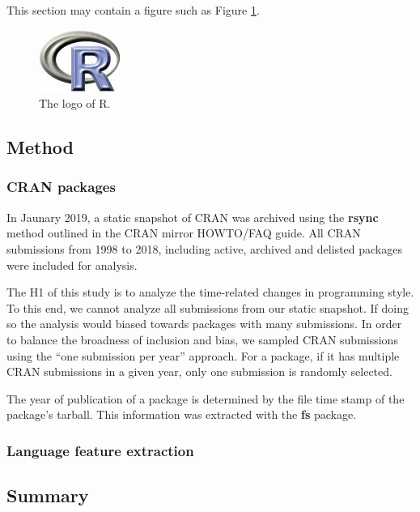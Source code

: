 This section may contain a figure such as Figure \ref{figure:rlogo}.

\begin{figure}[htbp]
  \centering
  \includegraphics{Rlogo}
  \caption{The logo of R.}
  \label{figure:rlogo}
\end{figure}

\hypertarget{method}{%
\subsection{Method}\label{method}}

\hypertarget{cran-packages}{%
\subsubsection{CRAN packages}\label{cran-packages}}

In Jaunary 2019, a static snapshot of CRAN was archived using the
\textbf{rsync} method outlined in the CRAN mirror HOWTO/FAQ guide. All
CRAN submissions from 1998 to 2018, including active, archived and
delisted packages were included for analysis.

The H1 of this study is to analyze the time-related changes in
programming style. To this end, we cannot analyze all submissions from
our static snapshot. If doing so the analysis would biased towards
packages with many submissions. In order to balance the broadness of
inclusion and bias, we sampled CRAN submissions using the ``one
submission per year'' approach. For a package, if it has multiple CRAN
submissions in a given year, only one submission is randomly selected.

The year of publication of a package is determined by the file time
stamp of the package's tarball. This information was extracted with the
\textbf{fs} package.

\hypertarget{language-feature-extraction}{%
\subsubsection{Language feature
extraction}\label{language-feature-extraction}}

\hypertarget{summary}{%
\subsection{Summary}\label{summary}}

